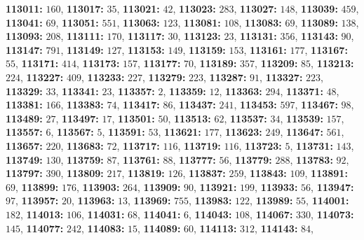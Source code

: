 \textsf{\bfseries 113011:} $160$, \textsf{\bfseries 113017:} $35$, \textsf{\bfseries 113021:} $42$, \textsf{\bfseries 113023:} $283$, \textsf{\bfseries 113027:} $148$, \textsf{\bfseries 113039:} $459$, \textsf{\bfseries 113041:} $69$, \textsf{\bfseries 113051:} $551$, \textsf{\bfseries 113063:} $123$, \textsf{\bfseries 113081:} $108$, \textsf{\bfseries 113083:} $69$, \textsf{\bfseries 113089:} $138$, \textsf{\bfseries 113093:} $208$, \textsf{\bfseries 113111:} $170$, \textsf{\bfseries 113117:} $30$, \textsf{\bfseries 113123:} $23$, \textsf{\bfseries 113131:} $356$, \textsf{\bfseries 113143:} $90$, \textsf{\bfseries 113147:} $791$, \textsf{\bfseries 113149:} $127$, \textsf{\bfseries 113153:} $149$, \textsf{\bfseries 113159:} $153$, \textsf{\bfseries 113161:} $177$, \textsf{\bfseries 113167:} $55$, \textsf{\bfseries 113171:} $414$, \textsf{\bfseries 113173:} $157$, \textsf{\bfseries 113177:} $70$, \textsf{\bfseries 113189:} $357$, \textsf{\bfseries 113209:} $85$, \textsf{\bfseries 113213:} $224$, \textsf{\bfseries 113227:} $409$, \textsf{\bfseries 113233:} $227$, \textsf{\bfseries 113279:} $223$, \textsf{\bfseries 113287:} $91$, \textsf{\bfseries 113327:} $223$, \textsf{\bfseries 113329:} $33$, \textsf{\bfseries 113341:} $23$, \textsf{\bfseries 113357:} $2$, \textsf{\bfseries 113359:} $12$, \textsf{\bfseries 113363:} $294$, \textsf{\bfseries 113371:} $48$, \textsf{\bfseries 113381:} $166$, \textsf{\bfseries 113383:} $74$, \textsf{\bfseries 113417:} $86$, \textsf{\bfseries 113437:} $241$, \textsf{\bfseries 113453:} $597$, \textsf{\bfseries 113467:} $98$, \textsf{\bfseries 113489:} $27$, \textsf{\bfseries 113497:} $17$, \textsf{\bfseries 113501:} $50$, \textsf{\bfseries 113513:} $62$, \textsf{\bfseries 113537:} $34$, \textsf{\bfseries 113539:} $157$, \textsf{\bfseries 113557:} $6$, \textsf{\bfseries 113567:} $5$, \textsf{\bfseries 113591:} $53$, \textsf{\bfseries 113621:} $177$, \textsf{\bfseries 113623:} $249$, \textsf{\bfseries 113647:} $561$, \textsf{\bfseries 113657:} $220$, \textsf{\bfseries 113683:} $72$, \textsf{\bfseries 113717:} $116$, \textsf{\bfseries 113719:} $116$, \textsf{\bfseries 113723:} $5$, \textsf{\bfseries 113731:} $143$, \textsf{\bfseries 113749:} $130$, \textsf{\bfseries 113759:} $87$, \textsf{\bfseries 113761:} $88$, \textsf{\bfseries 113777:} $56$, \textsf{\bfseries 113779:} $288$, \textsf{\bfseries 113783:} $92$, \textsf{\bfseries 113797:} $390$, \textsf{\bfseries 113809:} $217$, \textsf{\bfseries 113819:} $126$, \textsf{\bfseries 113837:} $259$, \textsf{\bfseries 113843:} $109$, \textsf{\bfseries 113891:} $69$, \textsf{\bfseries 113899:} $176$, \textsf{\bfseries 113903:} $264$, \textsf{\bfseries 113909:} $90$, \textsf{\bfseries 113921:} $199$, \textsf{\bfseries 113933:} $56$, \textsf{\bfseries 113947:} $97$, \textsf{\bfseries 113957:} $20$, \textsf{\bfseries 113963:} $13$, \textsf{\bfseries 113969:} $755$, \textsf{\bfseries 113983:} $122$, \textsf{\bfseries 113989:} $55$, \textsf{\bfseries 114001:} $182$, \textsf{\bfseries 114013:} $106$, \textsf{\bfseries 114031:} $68$, \textsf{\bfseries 114041:} $6$, \textsf{\bfseries 114043:} $108$, \textsf{\bfseries 114067:} $330$, \textsf{\bfseries 114073:} $145$, \textsf{\bfseries 114077:} $242$, \textsf{\bfseries 114083:} $15$, \textsf{\bfseries 114089:} $60$, \textsf{\bfseries 114113:} $312$, \textsf{\bfseries 114143:} $84$, 
